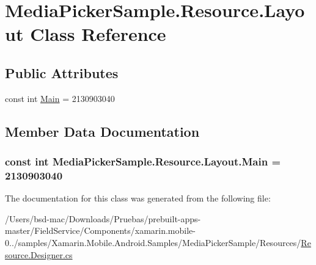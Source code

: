 \hypertarget{class_media_picker_sample_1_1_resource_1_1_layout}{\section{Media\+Picker\+Sample.\+Resource.\+Layout Class Reference}
\label{class_media_picker_sample_1_1_resource_1_1_layout}
}
\subsection*{Public Attributes}
\begin{DoxyCompactItemize}
\item 
const int \hyperlink{class_media_picker_sample_1_1_resource_1_1_layout_a51fea69ba8d6355e4dfa60d2b5b938aa}{Main} = 2130903040
\end{DoxyCompactItemize}


\subsection{Member Data Documentation}
\hypertarget{class_media_picker_sample_1_1_resource_1_1_layout_a51fea69ba8d6355e4dfa60d2b5b938aa}{
\subsubsection[{Main}]{\setlength{\rightskip}{0pt plus 5cm}const int Media\+Picker\+Sample.\+Resource.\+Layout.\+Main = 2130903040}}\label{class_media_picker_sample_1_1_resource_1_1_layout_a51fea69ba8d6355e4dfa60d2b5b938aa}


The documentation for this class was generated from the following file\+:\begin{DoxyCompactItemize}
\item 
/\+Users/bsd-\/mac/\+Downloads/\+Pruebas/prebuilt-\/apps-\/master/\+Field\+Service/\+Components/xamarin.\+mobile-\/0../samples/\+Xamarin.\+Mobile.\+Android.\+Samples/\+Media\+Picker\+Sample/\+Resources/\hyperlink{_components_2xamarin_8mobile-0_86_81_2samples_2_xamarin_8_mobile_8_android_8_samples_2_media_picb4289798373573612b81d1923e7d12fa}{Resource.\+Designer.\+cs}\end{DoxyCompactItemize}
